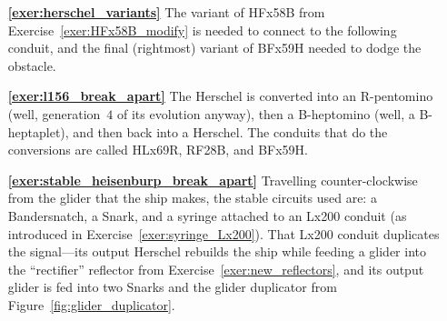 \begin{multicols}{2}
\begin{itemize}[leftmargin=0em]
		
		\item[\bf\color{ocre}\sffamily\ref{exer:herschel_variants}] The variant of HFx58B from Exercise~\ref{exer:HFx58B_modify} is needed to connect to the following conduit, and the final (rightmost) variant of BFx59H needed to dodge the obstacle.
		\begin{center}
		\end{center}
		
		
		\item[\bf\color{ocre}\sffamily\ref{exer:l156_break_apart}] The Herschel is converted into an R-pentomino (well, generation~$4$ of its evolution anyway), then a B-heptomino (well, a B-heptaplet), and then back into a Herschel. The conduits that do the conversions are called HLx69R, RF28B, and BFx59H.\\
		

%			
%			
%			
%			
		
		
		\item[\bf\color{ocre}\sffamily\ref{exer:stable_heisenburp_break_apart}] Travelling counter-clockwise from the glider that the ship makes, the stable circuits used are: a Bandersnatch, a Snark, and a syringe attached to an Lx200 conduit (as introduced in Exercise~\ref{exer:syringe_Lx200}). That Lx200 conduit duplicates the signal---its output Herschel rebuilds the ship while feeding a glider into the ``rectifier'' reflector from Exercise~\ref{exer:new_reflectors}, and its output glider is fed into two Snarks and the glider duplicator from Figure~\ref{fig:glider_duplicator}.\\
		

\end{itemize}
\end{multicols}
